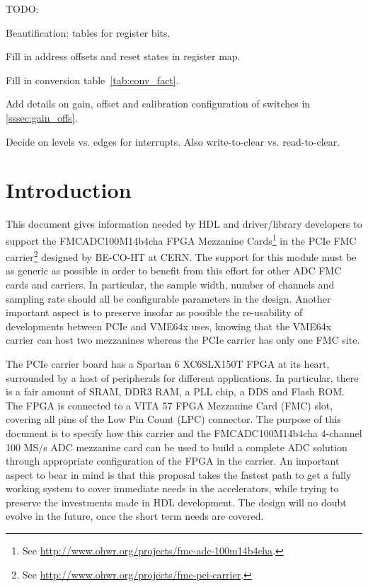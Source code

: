 \documentclass{article}
\newenvironment{packed_item}{
\begin{itemize}
  \setlength{\itemsep}{1pt}
  \setlength{\parskip}{0pt}
  \setlength{\parsep}{0pt}
}{\end{itemize}}
\begin{document}
TODO: 
\begin{packed_item}
\item Beautification: tables for register bits.
\item Fill in address offsets and reset states in register map.
\item Fill in conversion table~\ref{tab:conv_fact}.
\item Add details on gain, offset and calibration configuration of switches in \ref{sssec:gain_offs}.
\item Decide on levels vs. edges for interrupts. Also write-to-clear vs. read-to-clear.
\end{packed_item}

\pagebreak

\tableofcontents{}
\pagebreak

\section{Introduction}
This document gives information needed by HDL and driver/library developers to support the FMCADC100M14b4cha FPGA Mezzanine Cards\footnote{See \href{http://www.ohwr.org/projects/fmc-adc-100m14b4cha}{http://www.ohwr.org/projects/fmc-adc-100m14b4cha}.} in the PCIe FMC carrier\footnote{See \href{http://www.ohwr.org/projects/fmc-pci-carrier}{http://www.ohwr.org/projects/fmc-pci-carrier}.} designed by BE-CO-HT at CERN. The support for this module must be as generic as possible in order to benefit from this effort for other ADC FMC cards and carriers. In particular, the sample width, number of channels and sampling rate should all be configurable parameters in the design. Another important aspect is to preserve insofar as possible the re-usability of developments between PCIe and VME64x uses, knowing that the VME64x carrier can host two mezzanines whereas the PCIe carrier has only one FMC site.

The PCIe carrier board has a Spartan 6 XC6SLX150T FPGA at its heart, surrounded by a host of peripherals for different applications. In particular, there is a fair amount of SRAM, DDR3 RAM, a PLL chip, a DDS and Flash ROM. The FPGA is connected to a VITA 57 FPGA Mezzanine Card (FMC) slot, covering all pins of the Low Pin Count (LPC) connector. The purpose of this document is to specify how this carrier and the FMCADC100M14b4cha 4-channel 100 MS/s ADC mezzanine card can be used to build a complete ADC solution through appropriate configuration of the FPGA in the carrier. An important aspect to bear in mind is that this proposal takes the fastest path to get a fully working system to cover immediate needs in the accelerators, while trying to preserve the investments made in HDL development. The design will no doubt evolve in the future, once the short term needs are covered.
\end{document}
